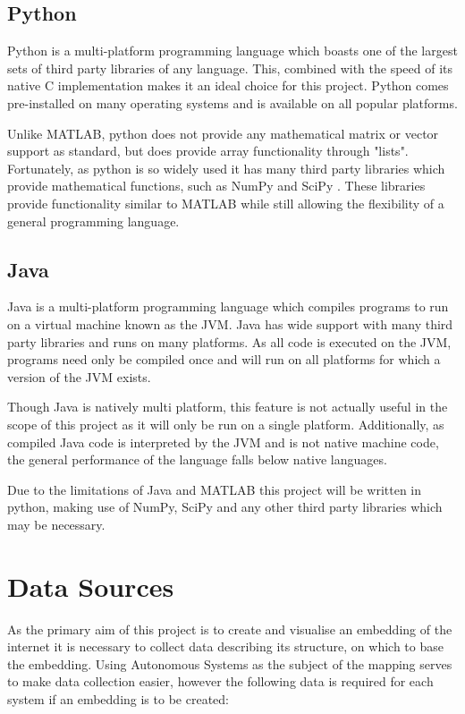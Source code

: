 \subsection{Python}
Python \cite{van_rossum_python_1995} is a multi-platform programming language which boasts one of the largest sets of third party libraries of any language. This, combined with the speed of its native C implementation makes it an ideal choice for this project. Python comes pre-installed on many operating systems and is available on all popular platforms.

Unlike MATLAB, python does not provide any mathematical matrix or vector support as standard, but does provide array functionality through "lists". Fortunately, as python is so widely used it has many third party libraries which provide mathematical functions, such as NumPy \cite{python_numpy_2015} and SciPy \cite{jones_scipy:_2001}. These libraries provide functionality similar to MATLAB while still allowing the flexibility of a general programming language.

\subsection{Java}
Java \cite{gosling_java_2014} is a multi-platform programming language which compiles programs to run on a virtual machine known as the JVM. Java has wide support with many third party libraries and runs on many platforms. As all code is executed on the JVM, programs need only be compiled once and will run on all platforms for which a version of the JVM exists. 

Though Java is natively multi platform, this feature is not actually useful in the scope of this project as it will only be run on a single platform. Additionally, as compiled Java code is interpreted by the JVM and is not native machine code, the general performance of the language falls below native languages.

Due to the limitations of Java and MATLAB this project will be written in python, making use of NumPy, SciPy and any other third party libraries which may be necessary.

\section{Data Sources}
\label{sec:DesignDataSources}
As the primary aim of this project is to create and visualise an embedding of the internet it is necessary to collect data describing its structure, on which to base the embedding. Using Autonomous Systems as the subject of the mapping serves to make data collection easier, however the following data is required for each system if an embedding is to be created:


